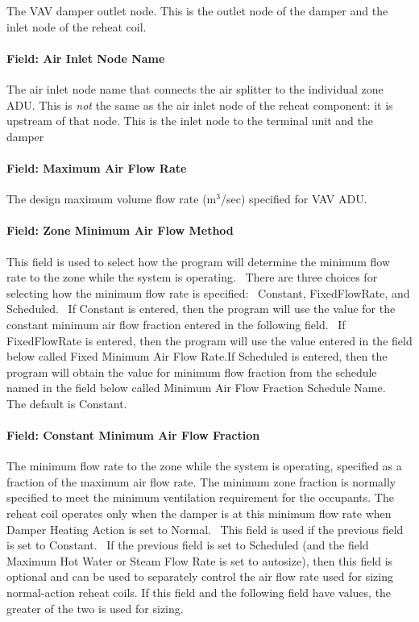 The VAV damper outlet node. This is the outlet node of the damper and the inlet node of the reheat coil.

\paragraph{Field: Air Inlet Node Name}\label{field-air-inlet-node-name-1}

The air inlet node name that connects the air splitter to the individual zone ADU. This is \emph{not} the same as the air inlet node of the reheat component: it is upstream of that node. This is the inlet node to the terminal unit and the damper

\paragraph{Field: Maximum Air Flow Rate}\label{field-maximum-air-flow-rate-2}

The design maximum volume flow rate (m\(^{3}\)/sec) specified for VAV ADU.

\paragraph{Field: Zone Minimum Air Flow Method}\label{field-zone-minimum-air-flow-method}

This field is used to select how the program will determine the minimum flow rate to the zone while the system is operating.~ There are three choices for selecting how the minimum flow rate is specified:~ Constant, FixedFlowRate, and Scheduled.~ If Constant is entered, then the program will use the value for the constant minimum air flow fraction entered in the following field.~ If FixedFlowRate is entered, then the program will use the value entered in the field below called Fixed Minimum Air Flow Rate.If Scheduled is entered, then the program will obtain the value for minimum flow fraction from the schedule named in the field below called Minimum Air Flow Fraction Schedule Name.~ The default is Constant.

\paragraph{Field: Constant Minimum Air Flow Fraction}\label{field-constant-minimum-air-flow-fraction}

The minimum flow rate to the zone while the system is operating, specified as a fraction of the maximum air flow rate. The minimum zone fraction is normally specified to meet the minimum ventilation requirement for the occupants. The reheat coil operates only when the damper is at this minimum flow rate when Damper Heating Action is set to Normal.~ This field is used if the previous field is set to Constant.~ If the previous field is set to Scheduled (and the field Maximum Hot Water or Steam Flow Rate is set to autosize), then this field is optional and can be used to separately control the air flow rate used for sizing normal-action reheat coils. If this field and the following field have values, the greater of the two is used for sizing.

